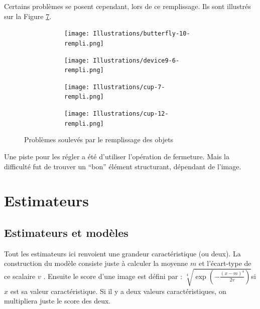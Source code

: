 \documentclass{article}
\theoremstyle{definition}
\begin{document}
      Certains problèmes se posent cependant, lors de ce remplissage. Ils sont illustrés sur la Figure \ref{problèmes-remplissage}.
      
      \begin{figure}[!h]
	\centering
	\begin{subfigure}{.47\textwidth}
	  \begin{subfigure}{.52\textwidth}
	    \centering
	    \texttt{[image: Illustrations/butterfly-10-rempli.png]}
	    \label{butterfly-rempli}
	  \end{subfigure}
	  \begin{subfigure}{.45\textwidth}
	    \centering
	    \texttt{[image: Illustrations/device9-6-rempli.png]}
	    \label{spirale-rempli}
	  \end{subfigure}
	\end{subfigure}
	\begin{subfigure}{.44\textwidth}
	  \begin{subfigure}{.46\textwidth}
	    \centering
	    \texttt{[image: Illustrations/cup-7-rempli.png]}
	  \label{1stcup-rempli}
	  \end{subfigure}
	  \begin{subfigure}{.46\textwidth}
	    \centering
	    \texttt{[image: Illustrations/cup-12-rempli.png]}
	  \label{2ndcup-rempli}
	  \end{subfigure}
	\end{subfigure}
	\caption{Problèmes soulevés par le remplissage des objets}
	\label{problèmes-remplissage}
      \end{figure}      
      
      Une piste pour les régler a été d'utiliser l'opération de fermeture. Mais la difficulté fut de trouver un ``bon'' élément structurant, dépendant de l'image.
   
  \section{Estimateurs}
  
    \subsection{Estimateurs et modèles}
    
    Tout les estimateurs ici renvoient une grandeur caractéristique (ou deux). La construction du modèle consiste juste à calculer la moyenne $m$ et l'écart-type de ce scalaire $v$ . Ensuite le score d'une image est défini par : $ \sqrt[4]{\exp{\left (-\frac{(x-m)^4}{2v}\right )}}$si $x$ est sa valeur caractéristique. Si il y a deux valeurs caractéristiques, on multipliera juste le score des deux.
  
\end{document}
